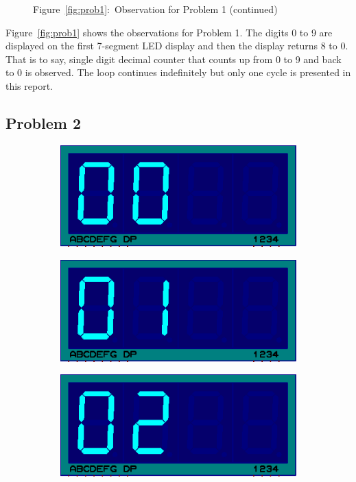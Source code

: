 \documentclass{lab_sheet}
\begin{document}
\begin{figure}[H]
\begin{subfigure}{.33\textwidth}
        \caption{}
        \label{fig:prob1-s}
      \end{subfigure}
      \hspace*{\fill}
      \caption*{Figure~\ref{fig:prob1}:~Observation for Problem 1 (continued)}
\end{figure}
Figure~\ref{fig:prob1} shows the observations for Problem 1. The digits 0 to 9 are displayed on the first 7-segment LED display and then the display returns 8 to 0. That is to say, single digit decimal counter that counts up from 0 to 9 and back to 0 is observed. The loop continues indefinitely but only one cycle is presented in this report.
\subsection*{Problem 2}
\begin{figure}[H]
    \begin{subfigure}{.33\textwidth}
      \centering
      \includegraphics[frame,width=.9\linewidth]{../Figures/d0}  
      \label{fig:prob2-a}
      \caption{}
    \end{subfigure}
    \begin{subfigure}{.33\textwidth}
      \centering
      \includegraphics[frame,width=.9\linewidth]{../Figures/d1}  
      \label{fig:prob2-b}
      \caption{}
    \end{subfigure}
    \begin{subfigure}{.33\textwidth}
      \centering
        \includegraphics[frame,width=.9\linewidth]{../Figures/d2}  

\end{subfigure}
\end{figure}
\end{document}
